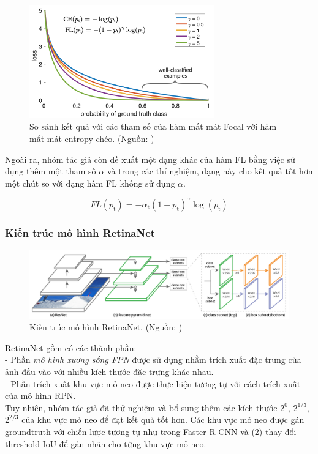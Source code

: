 {    \begin{figure}[H]
        \centering
        \includegraphics[width=8cm] {images/retinanet_focal_loss_curve}
        \caption{So sánh kết quả với các tham số của hàm mất mát Focal với hàm mất mát entropy chéo. (Nguồn: \cite{lin2017focal})}
        \label{fig:retinanet_focal_loss_curve}
    \end{figure}

    \noindent
    Ngoài ra, nhóm tác giả còn đề xuất một dạng khác của hàm FL bằng việc sử dụng thêm một tham số $\alpha$ và trong các thí nghiệm, dạng này cho kết quả tốt hơn một chút so với dạng hàm FL không sử dụng $\alpha$.

    \begin{equation}
        FL(p_\textrm{t}) = - \alpha_\textrm{t} (1 - p_\textrm{t})^\gamma \log (p_\textrm{t})
    \end{equation}
    
    \subsubsection*{Kiến trúc mô hình RetinaNet}

    \begin{figure}[H]
        \centering
        \includegraphics[width=14cm] {images/retinanet_model}
        \caption{Kiến trúc mô hình RetinaNet. (Nguồn: \cite{lin2017focal})}
        \label{fig:retinanet_model}
    \end{figure}

    RetinaNet gồm có các thành phần: \\
    - Phần \textit{mô hình xương sống FPN} được sử dụng nhằm trích xuất đặc trưng của ảnh đầu vào với nhiều kích thước đặc trưng khác nhau. \\
    - Phần trích xuất khu vực mỏ neo được thực hiện tương tự với cách trích xuất của mô hình RPN. \\
    Tuy nhiên, nhóm tác giả đã thử nghiệm và bổ sung thêm các kích thước $2^{0}$, $2^{1/3}$, $2^{2/3}$ của khu vực mỏ neo để đạt kết quả tốt hơn.
    Các khu vực mỏ neo được gán groundtruth với chiến lược tương tự như trong Faster R-CNN \cite{ren2015faster} và (2) thay đổi threshold IoU để gán nhãn cho từng khu vực mỏ neo.

}

